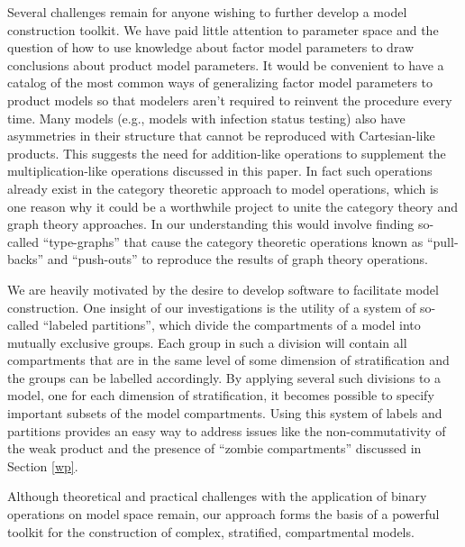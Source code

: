 Several challenges remain for anyone wishing to further develop a model construction toolkit. We have paid little attention to parameter space and the question of how to use knowledge about factor model parameters to draw conclusions about product model parameters. It would be convenient to have a catalog of the most common ways of generalizing factor model parameters to product models so that modelers aren't required to reinvent the procedure every time. Many models (e.g., models with infection status testing) also have asymmetries in their structure that cannot be reproduced with Cartesian-like products. This suggests the need for addition-like operations to supplement the multiplication-like operations discussed in this paper. In fact such operations already exist in the category theoretic approach to model operations, which is one reason why it could be a worthwhile project to unite the category theory and graph theory approaches. In our understanding this would involve finding so-called ``type-graphs'' that cause the category theoretic operations known as ``pull-backs'' and ``push-outs'' to  reproduce the results of graph theory operations.
\citep{fong2018seven, Libkind2022an, libkind2021operadic, baez2022compositional, baez2017compositional}

We are heavily motivated by the desire to develop software to facilitate model construction. One insight of our investigations is the utility of a system of so-called ``labeled partitions'', which divide the compartments of a model into mutually exclusive groups. Each group in such a division will contain all compartments that are in the same level of some dimension of stratification and the groups can be labelled accordingly. By applying several such divisions to a model, one for each dimension of stratification, it becomes possible to specify important subsets of the model compartments. Using this system of labels and partitions provides an easy way to address issues like the non-commutativity of the weak product and the presence of ``zombie compartments'' discussed in Section \ref{wp}.

Although theoretical and practical challenges with the application of binary operations on model space remain, our approach forms the basis of a powerful toolkit for the construction of complex, stratified, compartmental models.
